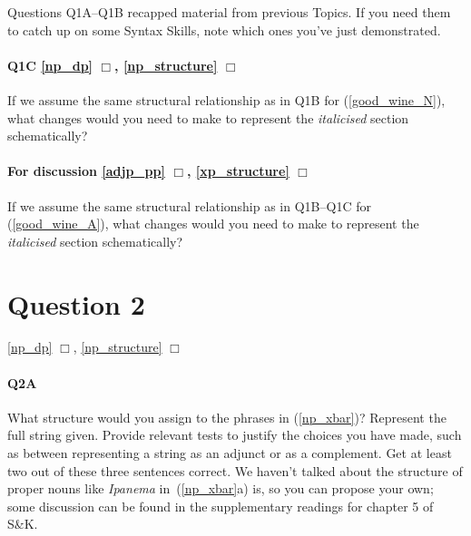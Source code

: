\documentclass{article}
\begin{document}
\begin{exe}
    \label{good_wine}
\end{exe}

Questions Q1A--Q1B recapped material from previous Topics. If you need them to catch up on some Syntax Skills, note which ones you've just demonstrated.


\paragraph{Q1C \ref{np_dp} $\Box$,
\ref{np_structure} $\Box$} If we assume the same structural relationship as in Q1B for (\ref{good_wine_N}), what changes would you need to make to represent the \emph{italicised} section schematically?

\paragraph{For discussion \ref{adjp_pp} $\Box$,
\ref{xp_structure} $\Box$} If we assume the same structural relationship as in Q1B--Q1C for (\ref{good_wine_A}), what changes would you need to make to represent the \emph{italicised} section schematically?


\section*{Question 2}
\hfill \ref{np_dp} $\Box$,
\ref{np_structure} $\Box$

\paragraph{Q2A} What structure would you assign to the phrases in (\ref{np_xbar})?
Represent the full string given.
Provide relevant tests to justify the choices you have made, such as between representing a string as an adjunct or as a complement. Get at least two out of these three sentences correct. We haven't talked about the structure of proper nouns like \emph{Ipanema} in~(\ref{np_xbar}a) is, so you can propose your own; some discussion can be found in the supplementary readings for chapter 5 of S\&K.
\begin{exe}
  \label{np_xbar}
\end{exe}
\end{document}
